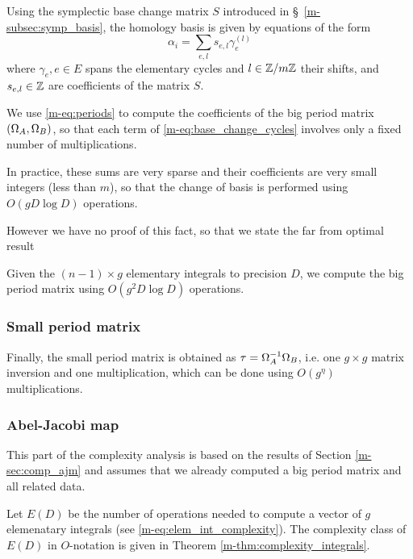 \documentclass[main.tex]{subfiles}
\begin{document}
   Using the symplectic base change matrix $S$ introduced
   in \S~\ref{m-subsec:symp_basis}, the homology basis is given
   by equations of the form
   \begin{equation}
       \label{eq:base_change_cycles}
       \alpha_i = \sum_{e,l} s_{e,l}\gamma_e^{(l)}
   \end{equation}
   where $\gamma_e,e\in E$ spans the elementary cycles
   and $l\in\mathbb{Z}/m\mathbb{Z}$ their shifts,
   and $s_{e,l}\in\mathbb{Z}$ are coefficients of the matrix $S$. 

   We use \eqref{m-eq:periods} to compute the coefficients of the big period
   matrix $(\Omega_A,\Omega_B)$, so that each term of \eqref{m-eq:base_change_cycles}
   involves only a fixed number of multiplications.

   In practice, these sums are very sparse and their coefficients are very small integers
   (less than $m$), so that the change of basis is performed using $O(gD\log D)$ operations.

   However we have no proof of this fact, so that we state the far from optimal
   result
   \begin{thm}
       Given the $(n-1)\times g$ elementary integrals to precision $D$,
       we compute the big period matrix using $O(g^2D\log D)$ operations.
   \end{thm}

   \subsubsection{Small period matrix}

   Finally, the small period matrix is obtained as $\tau=\Omega_A^{-1}\Omega_B$,
   i.e. one $g\times g$ matrix inversion and one multiplication, which can be done using
   $O(g^{\eta})$ multiplications.

   
   \subsubsection{Abel-Jacobi map}
   
  This part of the complexity analysis is based on the results of Section \ref{m-sec:comp_ajm} and assumes that we already computed a big period matrix and all related data.
   
  Let $E(D)$ be the number of operations needed to compute a vector of $g$ elemenatary integrals  (see \eqref{m-eq:elem_int_complexity}). The complexity class of $E(D)$ in $O$-notation is given in
  Theorem \ref{m-thm:complexity_integrals}.
  
\end{document}
